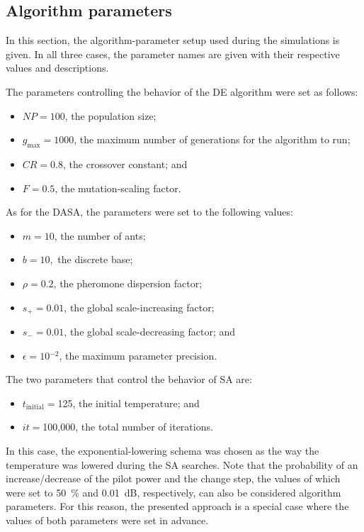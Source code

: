 \subsection{Algorithm parameters}

In this section, the algorithm-parameter setup used during the simulations
is given. In all three cases, the parameter names are given with their
respective values and descriptions.

The parameters controlling the behavior of the DE algorithm were set
as follows:
\begin{itemize}
\item $NP=100$, the population size;
\item $g_{\mathrm{max}}=1000$, the maximum number of generations for the
algorithm to run;
\item $CR=0.8$, the crossover constant; and
\item $F=0.5$, the mutation-scaling factor.
\end{itemize}
As for the DASA, the parameters were set to the following values:
\begin{itemize}
\item $m=10$, the number of ants;
\item $b=10,$ the discrete base;
\item $\rho=0.2$, the pheromone dispersion factor;
\item $s_{+}=0.01$, the global scale-increasing factor;
\item $s_{-}=0.01$, the global scale-decreasing factor; and 
\item $\epsilon=10{}^{-2}$, the maximum parameter precision.
\end{itemize}
The two parameters that control the behavior of SA are:
\begin{itemize}
\item $t_{\mathrm{initial}}=$125, the initial temperature; and
\item $it=$100,000, the total number of iterations.
\end{itemize}
In this case, the exponential-lowering schema was chosen as the way
the temperature was lowered during the SA searches. Note that the
probability of an increase/decrease of the pilot power and the change
step, the values of which were set to 50~\% and 0.01~dB, respectively,
can also be considered algorithm parameters. For this reason, the
presented approach is a special case where the values of both parameters
were set in advance.

\bigskip{}


